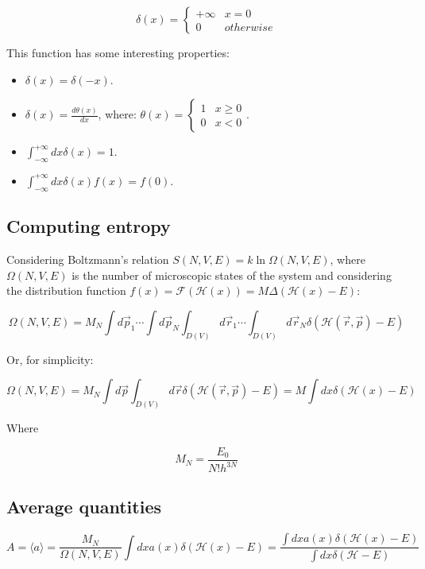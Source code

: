 	$$\delta(x) = \begin{cases}+\infty & x = 0\\ 0 &otherwise\end{cases}$$

	This function has some interesting properties:

	\begin{multicols}{2}
		\begin{itemize}
			\item $\delta(x) = \delta(-x)$.
			\item $\delta(x) = \frac{d\theta(x)}{dx}$, where: $\theta(x) = \begin{cases}1 &x\ge 0\\0 &x< 0\end{cases}$.
			\item $\int_{-\infty}^{+\infty}dx\delta(x) = 1$.
			\item $\int_{-\infty}^{+\infty}dx\delta(x)f(x) = f(0)$.
		\end{itemize}
	\end{multicols}

	\subsection{Computing entropy}
	Considering Boltzmann's relation $S(N, V, E) = k\ln\Omega(N, V, E)$, where $\Omega(N, V, E)$ is the number of microscopic states of the system and considering the distribution function $f(x) = \mathcal{F}(\mathcal{H}(x)) = M\Delta(\mathcal{H}(x)-E)$:

	$$\Omega(N, V, E) = M_N\int d\vec{p}_1\cdots\int d\vec{p}_N\int_{D(V)}d\vec{r}_1\cdots\int_{D(V)}d\vec{r}_N\delta(\mathcal{H}(\vec{r}, \vec{p})-E)$$

	Or, for simplicity:

	$$\Omega(N, V, E) = M_N\int d\vec{p}\int_{D(V)}d\vec{r}\delta(\mathcal{H}(\vec{r}, \vec{p})-E) = M\int dx\delta(\mathcal{H}(x)-E)$$

	Where

	$$M_N = \frac{E_0}{N!h^{3N}}$$

	\subsection{Average quantities}

	$$A = \langle a\rangle = \frac{M_N}{\Omega(N, V, E)}\int dx a(x)\delta(\mathcal{H}(x)-E) = \frac{\int dxa(x)\delta(\mathcal{H}(x)-E)}{\int dx\delta(\mathcal{H}-E)}$$

